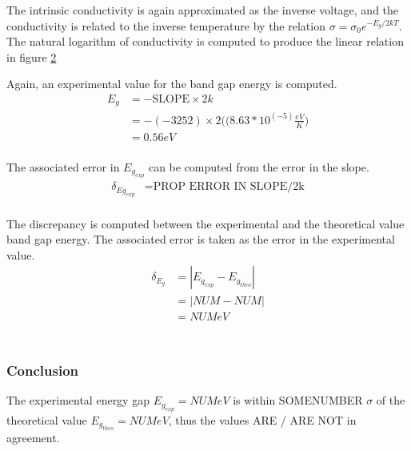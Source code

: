 \documentclass[a4paper]{article}
\begin{document}
\begin{figure}[H]
\centering
\label{task33plot}
\end{figure}

The intrinsic conductivity is again approximated as the inverse voltage, and the conductivity is related to the inverse temperature by the relation $\sigma = \sigma_0 e^{-E_g/2kT}$. The natural logarithm of conductivity is computed to produce the linear relation in figure \ref{task33plotLINEAR}

\begin{figure}[H]
\centering
\label{task33plotLINEAR}
\end{figure}

Again, an experimental value for the band gap energy is computed.
\begin{align*}
E_g &= - \text{SLOPE} \times 2k \\
    &= - (-3252) \times 2 
       \Big( (8.63 *10^(-5) \frac{eV}{K} \Big) \\
    &= 0.56 eV \\
\end{align*}

The associated error in $E_{g_{exp}}$ can be computed from the error in the slope.
\begin{align*}
\delta_{Eg_{exp}} &= \text{PROP ERROR IN SLOPE/2k} \\
\end{align*}

The discrepancy is computed between the experimental and the theoretical value band gap energy. The associated error is taken as the error in the experimental value.
\begin{align*}
\delta_{E_g} &= | E_{g_{exp}} - E_{g_{theo}} | \\
		     &= | NUM - NUM| \\
		     &= NUM eV \\
\end{align*}\\

\subsubsection{Conclusion}
The experimental energy gap $E_{g_{exp}} = NUM eV$ is within SOMENUMBER $\sigma$ of the theoretical value $E_{g_{theo}} = NUM eV$, thus the values  ARE / ARE NOT in agreement.
\end{document}
